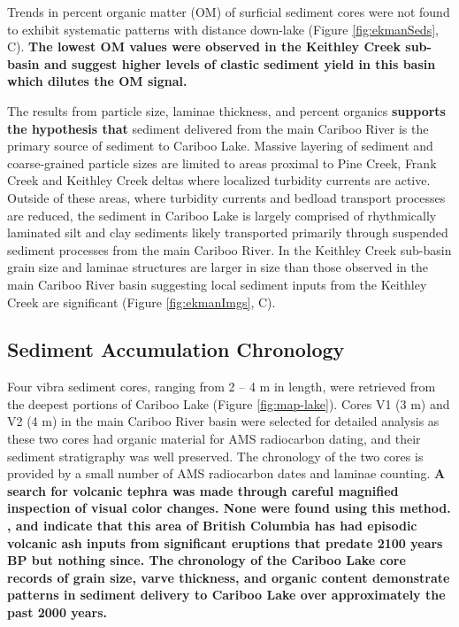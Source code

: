 \documentclass[Royal,times,doublespace,sageh]{sagej}
\begin{document}
Trends in percent organic matter (OM) of surficial sediment cores were
not found to exhibit systematic patterns with distance down-lake (Figure
\ref{fig:ekmanSeds}, C). \textbf{The lowest OM values were observed in
the Keithley Creek sub-basin and suggest higher levels of clastic
sediment yield in this basin which dilutes the OM signal.}

The results from particle size, laminae thickness, and percent organics
\textbf{supports the hypothesis that} sediment delivered from the main
Cariboo River is the primary source of sediment to Cariboo Lake. Massive
layering of sediment and coarse-grained particle sizes are limited to
areas proximal to Pine Creek, Frank Creek and Keithley Creek deltas
where localized turbidity currents are active. Outside of these areas,
where turbidity currents and bedload transport processes are reduced,
the sediment in Cariboo Lake is largely comprised of rhythmically
laminated silt and clay sediments likely transported primarily through
suspended sediment processes from the main Cariboo River. In the
Keithley Creek sub-basin grain size and laminae structures are larger in
size than those observed in the main Cariboo River basin suggesting
local sediment inputs from the Keithley Creek are significant (Figure
\ref{fig:ekmanImgs}, C).

\hypertarget{sediment-accumulation-chronology}{%
\subsection{Sediment Accumulation
Chronology}\label{sediment-accumulation-chronology}}

Four vibra sediment cores, ranging from 2 -- 4 m in length, were
retrieved from the deepest portions of Cariboo Lake (Figure
\ref{fig:map-lake}). Cores V1 (3 m) and V2 (4 m) in the main Cariboo
River basin were selected for detailed analysis as these two cores had
organic material for AMS radiocarbon dating, and their sediment
stratigraphy was well preserved. The chronology of the two cores is
provided by a small number of AMS radiocarbon dates and laminae
counting. \textbf{A search for volcanic tephra was made through careful
magnified inspection of visual color changes. None were found using this
method. \citet{Westgate1977}, \citet{Hallett1997} and
\citet{Maurer2012b} indicate that this area of British Columbia has had
episodic volcanic ash inputs from significant eruptions that predate
2100 years BP but nothing since. The chronology of the Cariboo Lake core
records of grain size, varve thickness, and organic content demonstrate
patterns in sediment delivery to Cariboo Lake over approximately the
past 2000 years.}
\end{document}
